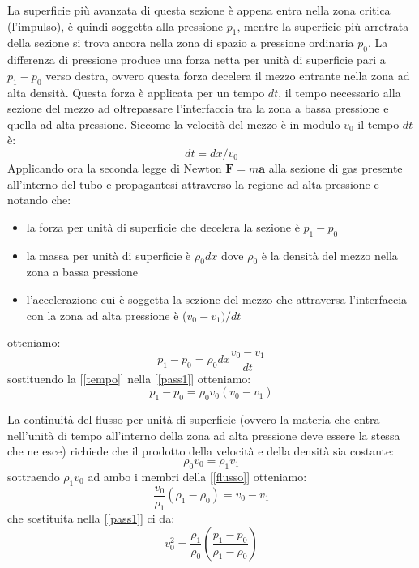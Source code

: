 \documentclass[a4paper,10pt,twoside]{article}
\begin{document}
La superficie più avanzata di questa sezione è appena entra nella zona critica (l'impulso), è quindi soggetta alla pressione $p_1$, mentre la superficie più arretrata della sezione si trova ancora nella zona di spazio a pressione ordinaria  $p_0$. La differenza di pressione produce una forza netta per unità di superficie pari a $p_1-p_0$ verso destra, ovvero questa forza decelera il mezzo entrante nella zona ad alta densità. Questa forza è applicata per un tempo $dt$, il tempo necessario alla sezione del mezzo  ad oltrepassare l'interfaccia tra la zona a bassa pressione e quella ad alta pressione. Siccome la velocità del mezzo è in modulo $v_0$ il tempo $dt$ è: 
\begin{equation}\label{tempo}
 dt=dx/v_0
\end{equation}
Applicando ora la seconda legge di Newton $\mathbf{F}=m\mathbf{a}$ alla sezione di gas presente all'interno del tubo e propagantesi attraverso la regione ad alta pressione e notando che:
\begin{itemize}
 \item la forza per unità di superficie che decelera la sezione è $p_1-p_0$
\item la massa per unità di superficie è $\rho_0dx$ dove $\rho_0$ è la densità del mezzo nella zona a bassa pressione
\item l'accelerazione cui è soggetta la sezione del mezzo che attraversa l'interfaccia con la zona ad alta pressione è ($v_0-v_1)/dt$
\end{itemize}
otteniamo:
\begin{equation}\label{pass1}
 p_1-p_0=\rho_0dx\frac{v_0-v_1}{dt}
\end{equation}
sostituendo la [\ref{tempo}] nella [\ref{pass1}] otteniamo:
\begin{equation}
 p_1-p_0=\rho_0v_0(v_0-v_1)
\end{equation}

La continuità del flusso per unità di superficie (ovvero la materia che entra nell'unità di tempo all'interno della zona ad alta pressione deve essere la stessa che ne esce) richiede che il prodotto della velocità e della densità sia costante:
\begin{equation}\label{flusso}
\rho_0v_0=\rho_1v_1
\end{equation}
sottraendo $\rho_1v_0$ ad ambo i membri della [\ref{flusso}] otteniamo:
\begin{equation}
 \frac{v_0}{\rho_1}(\rho_1-\rho_0)=v_0-v_1
\end{equation}
che sostituita nella [\ref{pass1}] ci da:
\begin{equation}\label{vel1}
 v_0^2=\frac{\rho_1}{\rho_0}\left(\frac{p_1-p_0}{\rho_1-\rho_0}\right)
\end{equation}
\end{document}
